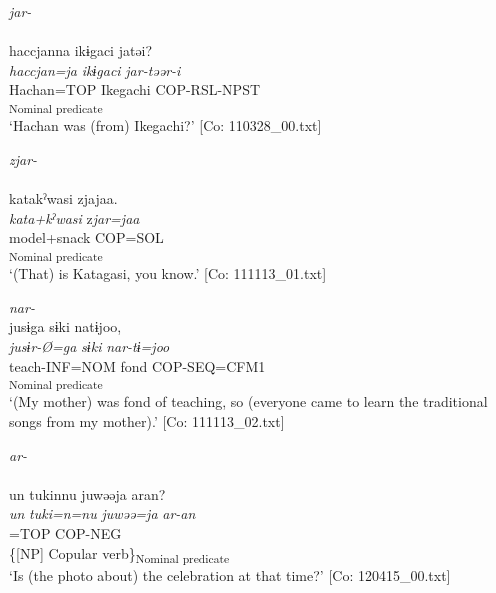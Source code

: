 \ea \label{ex:4.13}
\ea   \textit{jar-} \label{ex:4.13a}\\\\
    \gllll haccjanna  ikɨgaci  jatəi?\\
      \textit{haccjan=ja}  \textit{ikɨgaci}  \textit{jar{}-təər-i}\\
      Hachan=TOP  Ikegachi  COP-RSL-NPST\\
        [NP  Copular verb]\textsubscript{Nominal predicate}\\
    \glt       ‘Hachan was (from) Ikegachi?’      [Co: 110328\_00.txt]

\ex \textit{zjar-}\\\\
\gllll    katakˀwasi  zjajaa.\\
      \textit{kata+kˀwasi}  z\textit{jar=jaa}\\
      model+snack  COP=SOL\\
      [NP  Copular verb]\textsubscript{Nominal predicate}\\
      \glt       ‘(That) is Katagasi, you know.’ [Co: 111113\_01.txt]

\ex  \textit{nar-}\\
\gllll   jusɨga  sɨki  natɨjoo,\\
      \textit{jusɨr-Ø=ga}  \textit{sɨki}  \textit{nar{}-tɨ=joo}\\
      teach-INF=NOM  fond  COP-SEQ=CFM1\\
        [NP  Copular verb]\textsubscript{Nominal predicate}\\
      \glt       ‘(My mother) was fond of teaching, so (everyone came to learn the traditional songs from my mother).’ [Co: 111113\_02.txt]

\ex  \textit{ar-}\\\\
\gllll     un  tukinnu  juwəəja  aran?\\
      \textit{un}  \textit{tuki=n=nu}  \textit{juwəə=ja}  \textit{ar{}-an}\\
      [that  time=DAT1=GEN  celebration]=TOP  COP-NEG\\
      \{[NP]  Copular verb\}\textsubscript{Nominal predicate}\\
      \glt       ‘Is (the photo about) the celebration at that time?’ [Co: 120415\_00.txt]
    \z
\z

